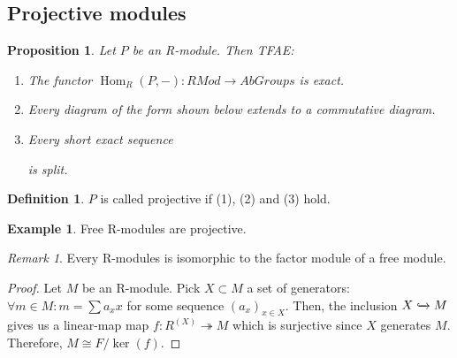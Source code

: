\documentclass{article}
\DeclareMathOperator{\Hom}{Hom}
\theoremstyle{definition}
\newtheorem{definition}{Definition}[subsection]
\newtheorem{eg}{Example}[subsection]
\theoremstyle{remark}
\newtheorem*{remark}{Remark}
\theoremstyle{plain}
\newtheorem{prop}{Proposition}[subsection]
\begin{document}
\subsection{Projective modules}

\begin{prop}
    Let \(P\) be an R-module. Then TFAE:
    \begin{enumerate}
        \item The functor \(\Hom_R(P, -): RMod \to AbGroups\) is exact.
        \item Every diagram of the form shown below extends to a commutative diagram.

        \item Every short exact sequence 
        is split.
    \end{enumerate}
\end{prop}

\begin{definition}
    \(P\) is called projective if (1), (2) and (3) hold.
\end{definition}

\begin{eg}
    Free R-modules are projective.
\end{eg}

\begin{remark}
    Every R-modules is isomorphic to the factor module of a 
    free module. 
\end{remark}
\begin{proof}
    Let \(M\) be an R-module. Pick \(X \subset M\) a set of generators: 
    \(\forall m \in M: m = \sum a_xx\) for some sequence \((a_x)_{x \in X}\). 
    Then, the inclusion \(X \xhookrightarrow{} M\) gives us a linear-map map 
    \(f: R^{(X)} \twoheadrightarrow{} M\) which is surjective since \(X\) generates \(M\).
    Therefore, \(M \cong F/\ker(f)\).
\end{proof}
\end{document}
